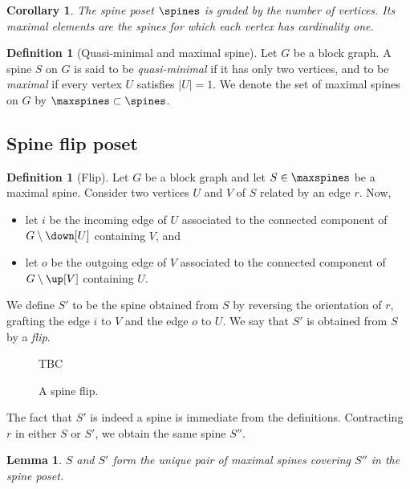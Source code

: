 \documentclass{amsart}
\newtheorem{corollary}[theorem]{Corollary}
\newtheorem{lemma}[theorem]{Lemma}
\theoremstyle{definition}
\newtheorem{definition}[theorem]{Definition}
\begin{document}
\begin{corollary} 
 The spine poset $\spines$ is graded by the number of vertices. Its maximal elements are the spines for which each vertex has cardinality one. 
\end{corollary}
  
\begin{definition}[Quasi-minimal and maximal spine] 
  Let $G$ be a block graph. A spine $S$ on $G$ is said to be \emph{quasi-minimal} if it has only two vertices, and to be \emph{maximal} if every vertex $U$ satisfies $|U|=1$. We denote the set of maximal spines on $G$ by $\maxspines \subset \spines$. 
\end{definition}
  

\subsection{Spine flip poset}

\begin{definition}[Flip] Let $G$ be a block graph and let $S \in \maxspines$ be a maximal spine. Consider two vertices $U$ and $V$ of $S$ related by an edge $r$. Now, 
\begin{itemize}
  \item let $i$ be the incoming edge of $U$ associated to the connected component of $G \setminus \down[U]$ containing $V$, and
  \item let $o$ be the outgoing edge of $V$ associated to the connected component of $G \setminus \up[V]$ containing $U$.
\end{itemize}
We define $S'$ to be the spine obtained from $S$ by reversing the orientation of $r$, grafting the edge $i$ to $V$ and the edge $o$ to $U$. We say that $S'$ is obtained from $S$ by a \emph{flip}. 
\end{definition}

\begin{figure}[h!]
  TBC
  \caption{A spine flip.}
\end{figure}

The fact that $S'$ is indeed a spine is immediate from the definitions. Contracting $r$ in either $S$ or $S'$, we obtain the same spine $S''$. 

\begin{lemma} 
  \label{lemma:coveringpair} 
  $S$ and $S'$ form the unique pair of maximal spines covering $S''$ in the spine poset.
\end{lemma}
\end{document}
